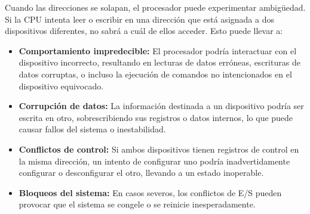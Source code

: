 \documentclass[12pt, a4paper]{article}
\begin{document}
Cuando las direcciones se solapan, el procesador puede experimentar ambigüedad. Si la CPU intenta leer o escribir en una dirección que está asignada a dos dispositivos diferentes, no sabrá a cuál de ellos acceder. Esto puede llevar a:
\begin{itemize}
    \item \textbf{Comportamiento impredecible:} El procesador podría interactuar con el dispositivo incorrecto, resultando en lecturas de datos erróneas, escrituras de datos corruptas, o incluso la ejecución de comandos no intencionados en el dispositivo equivocado.
    \item \textbf{Corrupción de datos:} La información destinada a un dispositivo podría ser escrita en otro, sobrescribiendo sus registros o datos internos, lo que puede causar fallos del sistema o inestabilidad.
    \item \textbf{Conflictos de control:} Si ambos dispositivos tienen registros de control en la misma dirección, un intento de configurar uno podría inadvertidamente configurar o desconfigurar el otro, llevando a un estado inoperable.
    \item \textbf{Bloqueos del sistema:} En casos severos, los conflictos de E/S pueden provocar que el sistema se congele o se reinicie inesperadamente.
\end{itemize}
\end{document}
